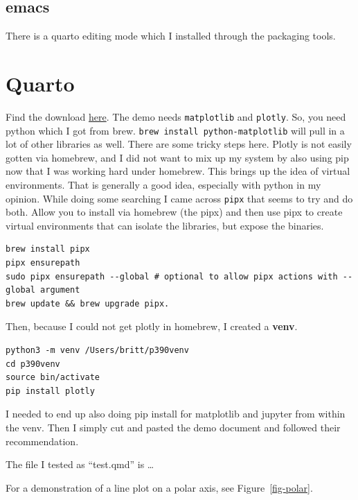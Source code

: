 \documentclass[
  letterpaper,
  DIV=11,
  numbers=noendperiod]{scrreprt}
\begin{document}
\section{emacs}\label{emacs-1}

There is a quarto editing mode which I installed through the packaging
tools.

\chapter{Quarto}\label{quarto}

Find the download \href{https://quarto.org/docs/get-started/}{here}. The
demo needs \texttt{matplotlib} and \texttt{plotly}. So, you need python
which I got from brew. \texttt{brew\ install\ python-matplotlib} will
pull in a lot of other libraries as well. There are some tricky steps
here. Plotly is not easily gotten via homebrew, and I did not want to
mix up my system by also using pip now that I was working hard under
homebrew. This brings up the idea of virtual environments. That is
generally a good idea, especially with python in my opinion. While doing
some searching I came across \texttt{pipx} that seems to try and do
both. Allow you to install via homebrew (the pipx) and then use pipx to
create virtual environments that can isolate the libraries, but expose
the binaries.

\begin{verbatim}
brew install pipx
pipx ensurepath
sudo pipx ensurepath --global # optional to allow pipx actions with --global argument
brew update && brew upgrade pipx.
\end{verbatim}

Then, because I could not get plotly in homebrew, I created a
\textbf{venv}.

\begin{verbatim}
python3 -m venv /Users/britt/p390venv
cd p390venv
source bin/activate
pip install plotly
\end{verbatim}

I needed to end up also doing pip install for matplotlib and jupyter
from within the venv. Then I simply cut and pasted the demo document and
followed their recommendation.

The file I tested as ``test.qmd'' is \ldots{}

For a demonstration of a line plot on a polar axis, see
Figure~\ref{fig-polar}.
\end{document}
